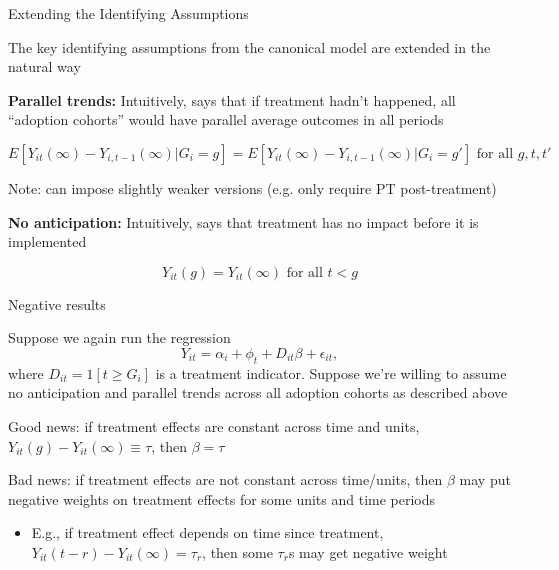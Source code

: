 \documentclass[aspectratio = 169, 13pt]{beamer}
\begin{document}
\begin{frame}{Extending the Identifying Assumptions}
  \begin{wideitemize}
    \item
    The key identifying assumptions from the canonical model are extended in the natural way

    \item
    \textbf{Parallel trends:} Intuitively, says that if treatment hadn't happened, all ``adoption cohorts'' would have parallel average outcomes in all periods

    $$ E[ Y_{it}(\infty) - Y_{i,t-1}(\infty) | G_i = g ] = E[ Y_{it}(\infty) - Y_{i,t-1}(\infty) | G_i = g' ] \text{ for all } g,t,t' $$


    Note: can impose slightly weaker versions (e.g. only require PT post-treatment)

    \item
    \textbf{No anticipation:} Intuitively, says that treatment has no impact before it is implemented

    $$Y_{it}(g) = Y_{it}(\infty) \text{ for all } t<g$$
  \end{wideitemize}
\end{frame}


\begin{frame}{Negative results}
  \begin{wideitemize}
    \item
    Suppose we again run the regression
    \vspace{-3mm}
    $$Y_{it} = \alpha_i + \phi_t + D_{it} \beta  + \epsilon_{it}, $$
    \noindent where $D_{it} = 1[t \geq G_i]$ is a treatment indicator. Suppose we're willing to assume no anticipation and  parallel trends across all adoption cohorts as described above

    \pause
    \vspace{-3mm}
    \item
    Good news: if treatment effects are constant across time and units, $Y_{it}(g) - Y_{it}(\infty) \equiv \tau$, then $\beta = \tau$

    \pause
    \vspace{-3mm}
    \item
    Bad news: if treatment effects are not constant across time/units, then $\beta$ may put negative weights on treatment effects for some units and time periods
    \begin{itemize}
      \item
            E.g., if treatment effect depends on time since treatment, $Y_{it}(t-r) - Y_{it}(\infty) = \tau_{r}$, then some $\tau_r$s may get negative weight
    \end{itemize}
  \end{wideitemize}
\end{frame}
\end{document}
